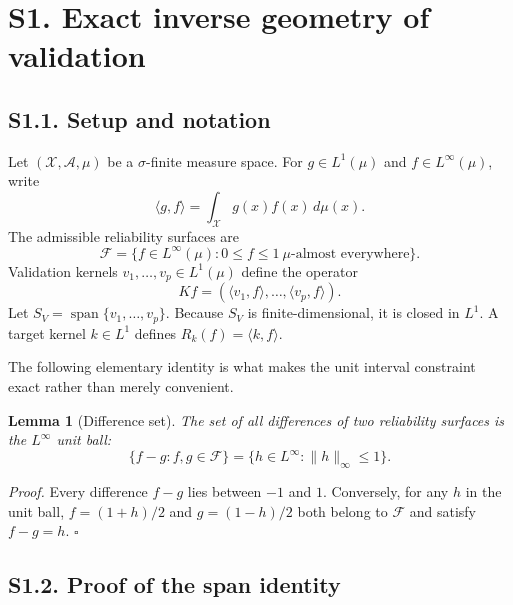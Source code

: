 \documentclass[10pt,twocolumn]{article}
\newtheorem{lemma}{Lemma}
\newcommand{\cF}{\mathcal F}
\newcommand{\Span}{\operatorname{span}}
\begin{document}
\section*{S1. Exact inverse geometry of validation}

\subsection*{S1.1. Setup and notation}

Let $(\mathcal X,\mathcal A,\mu)$ be a $\sigma$-finite measure space. For $g\in L^1(\mu)$ and $f\in L^\infty(\mu)$, write
\[
\langle g,f\rangle=\int_{\mathcal X}g(x)f(x)\,d\mu(x).
\]
The admissible reliability surfaces are
\begin{equation}
\cF=\{f\in L^\infty(\mu):0\le f\le1\ \mu\text{-almost everywhere}\}.
\label{si:eq:F}
\end{equation}
Validation kernels $v_1,\ldots,v_p\in L^1(\mu)$ define the operator
\begin{equation}
Kf=(\langle v_1,f\rangle,\ldots,\langle v_p,f\rangle).
\label{si:eq:K}
\end{equation}
Let $S_V=\Span\{v_1,\ldots,v_p\}$. Because $S_V$ is finite-dimensional, it is closed in $L^1$. A target kernel $k\in L^1$ defines $R_k(f)=\langle k,f\rangle$.

The following elementary identity is what makes the unit interval constraint exact rather than merely convenient.

\begin{lemma}[Difference set]
\label{si:lem:difference}
The set of all differences of two reliability surfaces is the $L^\infty$ unit ball:
\begin{equation}
\{f-g:f,g\in\cF\}=\{h\in L^\infty:\|h\|_\infty\le1\}.
\label{si:eq:difference}
\end{equation}
\end{lemma}

\noindent\textit{Proof.}
Every difference $f-g$ lies between $-1$ and $1$. Conversely, for any $h$ in the unit ball, $f=(1+h)/2$ and $g=(1-h)/2$ both belong to $\cF$ and satisfy $f-g=h$. \hfill$\square$

\subsection*{S1.2. Proof of the span identity}
\end{document}
